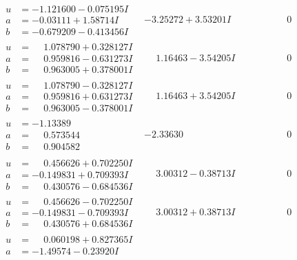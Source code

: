 \documentclass[1p]{elsarticle_modified}
\theoremstyle{definition}
\begin{document}
$$\begin{array}{c|c|c}
\begin{aligned}
u &= -1.121600 - 0.075195 I \\
a &= -0.03111 + 1.58714 I \\
b &= -0.679209 - 0.413456 I\end{aligned}
 & -3.25272 + 3.53201 I & \phantom{-0.000000 } 0 \\ \hline\begin{aligned}
u &= \phantom{-}1.078790 + 0.328127 I \\
a &= \phantom{-}0.959816 - 0.631273 I \\
b &= \phantom{-}0.963005 + 0.378001 I\end{aligned}
 & \phantom{-}1.16463 - 3.54205 I & \phantom{-0.000000 } 0 \\ \hline\begin{aligned}
u &= \phantom{-}1.078790 - 0.328127 I \\
a &= \phantom{-}0.959816 + 0.631273 I \\
b &= \phantom{-}0.963005 - 0.378001 I\end{aligned}
 & \phantom{-}1.16463 + 3.54205 I & \phantom{-0.000000 } 0 \\ \hline\begin{aligned}
u &= -1.13389\phantom{ +0.000000I} \\
a &= \phantom{-}0.573544\phantom{ +0.000000I} \\
b &= \phantom{-}0.904582\phantom{ +0.000000I}\end{aligned}
 & -2.33630\phantom{ +0.000000I} & \phantom{-0.000000 } 0 \\ \hline\begin{aligned}
u &= \phantom{-}0.456626 + 0.702250 I \\
a &= -0.149831 + 0.709393 I \\
b &= \phantom{-}0.430576 - 0.684536 I\end{aligned}
 & \phantom{-}3.00312 - 0.38713 I & \phantom{-0.000000 } 0 \\ \hline\begin{aligned}
u &= \phantom{-}0.456626 - 0.702250 I \\
a &= -0.149831 - 0.709393 I \\
b &= \phantom{-}0.430576 + 0.684536 I\end{aligned}
 & \phantom{-}3.00312 + 0.38713 I & \phantom{-0.000000 } 0 \\ \hline\begin{aligned}
u &= \phantom{-}0.060198 + 0.827365 I \\
a &= -1.49574 - 0.23920 I \\

\end{aligned}
\end{array}$$
\end{document}
